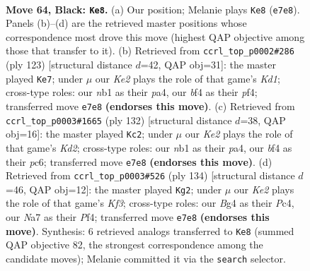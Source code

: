 \documentclass[11pt]{article}
\begin{document}
\clearpage

\begin{figure}[p]\centering
\begin{subfigure}{0.46\textwidth}\centering
\resizebox{\linewidth}{!}{%
\newchessgame
\chessboard[
  setfen={6K1/n1P1k3/p7/P4p1p/4pBb1/6P1/8/RN1r4 b - - 35 64},
  showmover=false,
  pgfstyle=straightmove, color=movearrow, markmove={e7-e8}
]}
\caption{}
\end{subfigure}\hfill
\begin{subfigure}{0.46\textwidth}\centering
\resizebox{\linewidth}{!}{%
\newchessgame
\chessboard[
  setfen={3k4/8/2p4p/r2b3P/P3pP2/4K3/8/R2B4 b - - 2 62},
  showmover=false,
  pgfstyle=straightmove, color=movearrow, markmove={d8-e7}
]}
\caption{}
\end{subfigure}
\\[4pt]
\begin{subfigure}{0.46\textwidth}\centering
\resizebox{\linewidth}{!}{%
\newchessgame
\chessboard[
  setfen={1r2b3/6pk/2p1P3/R2p1pB1/p2P1P1P/P7/3K4/8 w - - 3 67},
  showmover=false,
  pgfstyle=straightmove, color=movearrow, markmove={d2-c2}
]}
\caption{}
\end{subfigure}\hfill
\begin{subfigure}{0.46\textwidth}\centering
\resizebox{\linewidth}{!}{%
\newchessgame
\chessboard[
  setfen={8/2r4p/Bp3k2/2bR1p1P/P1P2P2/5K2/8/8 w - - 55 68},
  showmover=false,
  pgfstyle=straightmove, color=movearrow, markmove={f3-g2}
]}
\caption{}
\end{subfigure}
\caption{\textbf{Move 64, Black: \texttt{Ke8}.} (a) Our position; Melanie plays \texttt{Ke8} (\texttt{e7e8}). Panels (b)--(d) are the retrieved master positions whose correspondence most drove this move (highest QAP objective among those that transfer to it). (b) Retrieved from \texttt{ccrl\_top\_p0002\#286} (ply 123) [structural distance $d$=42, QAP obj=31]: the master played \texttt{Ke7}; under $\mu$ our \emph{Ke2} plays the role of that game's \emph{Kd1}; cross-type roles: our \emph{n}b1 as their \emph{p}a4, our \emph{b}f4 as their \emph{p}f4; transferred move \texttt{e7e8} \textbf{(endorses this move)}. (c) Retrieved from \texttt{ccrl\_top\_p0003\#1665} (ply 132) [structural distance $d$=38, QAP obj=16]: the master played \texttt{Kc2}; under $\mu$ our \emph{Ke2} plays the role of that game's \emph{Kd2}; cross-type roles: our \emph{n}b1 as their \emph{p}a4, our \emph{b}f4 as their \emph{p}c6; transferred move \texttt{e7e8} \textbf{(endorses this move)}. (d) Retrieved from \texttt{ccrl\_top\_p0003\#526} (ply 134) [structural distance $d$=46, QAP obj=12]: the master played \texttt{Kg2}; under $\mu$ our \emph{Ke2} plays the role of that game's \emph{Kf3}; cross-type roles: our \emph{B}g4 as their \emph{P}c4, our \emph{N}a7 as their \emph{P}f4; transferred move \texttt{e7e8} \textbf{(endorses this move)}. Synthesis: 6 retrieved analogs transferred to \texttt{Ke8} (summed QAP objective 82, the strongest correspondence among the candidate moves); Melanie committed it via the \texttt{search} selector.}
\label{fig:thought-m127}
\end{figure}
\end{document}
